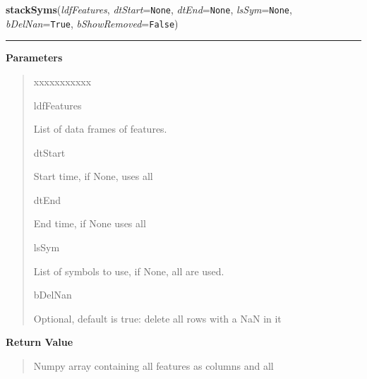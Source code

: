\hspace{.8\funcindent}\begin{boxedminipage}{\funcwidth}

    \raggedright \textbf{stackSyms}(\textit{ldfFeatures}, \textit{dtStart}={\tt None}, \textit{dtEnd}={\tt None}, \textit{lsSym}={\tt None}, \textit{bDelNan}={\tt True}, \textit{bShowRemoved}={\tt False})

    \vspace{-1.5ex}

    \rule{\textwidth}{0.5\fboxrule}
\setlength{\parskip}{2ex}
\setlength{\parskip}{1ex}
      \textbf{Parameters}
      \vspace{-1ex}

      \begin{quote}
        \begin{Ventry}{xxxxxxxxxxx}

          \item[ldfFeatures]

          List of data frames of features.

          \item[dtStart]

          Start time, if None, uses all

          \item[dtEnd]

          End time, if None uses all

          \item[lsSym]

          List of symbols to use, if None, all are used.

          \item[bDelNan]

          Optional, default is true: delete all rows with a NaN in it

        \end{Ventry}

      \end{quote}

      \textbf{Return Value}
    \vspace{-1ex}

      \begin{quote}
      Numpy array containing all features as columns and all

      \end{quote}

    \end{boxedminipage}

    \label{QSTK:qstkfeat:featutil:normFeatures}

